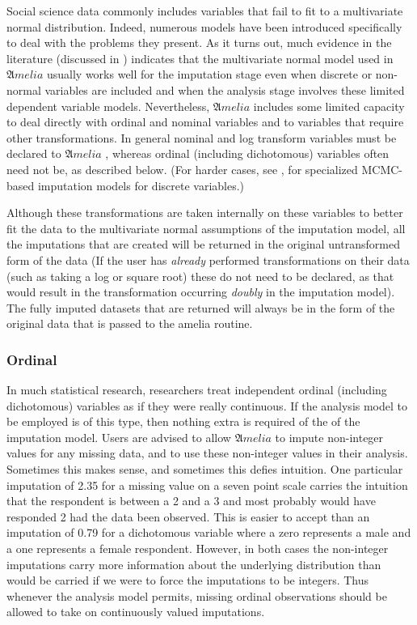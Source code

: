 \documentclass[12pt,titlepage]{article}
\newcommand{\Amelia}{\ensuremath{\mathfrak Amelia} }
\begin{document}
Social science data commonly includes variables that fail to fit to
a multivariate normal distribution. Indeed, numerous models have been
introduced specifically to deal with the problems they present.  As it
turns out, much evidence in the literature (discussed in
\citealt{KinHonJos01}) indicates that the multivariate normal model
used in ${\mathfrak Amelia}$ usually works well for the imputation
stage even when discrete or non-normal variables are included and when
the analysis stage involves these limited dependent variable models.
Nevertheless, ${\mathfrak Amelia}$ includes some limited capacity to
deal directly with ordinal and nominal variables and to variables that
require other transformations.  In general nominal and log transform
variables must be declared to \Amelia, whereas ordinal (including
dichotomous) variables often need not be, as described below.  (For
harder cases, see \citep{Schafer97}, for specialized MCMC-based imputation
models for discrete variables.)\nocite{KinHonJos01}

Although these transformations are taken internally on these variables
to better fit the data to the multivariate normal assumptions of the
imputation model, all the imputations that are created will be
returned in the original untransformed form of the data (If the user
has \emph{already} performed transformations on their data (such as
taking a log or square root) these do not need to be declared, as that
would result in the transformation occurring \emph{doubly} in the
imputation model).  The fully imputed datasets that are returned will
always be in the form of the original data that is passed to the
amelia routine.

\subsubsection{Ordinal}
\label{sec:ord}
In much statistical research, researchers treat independent ordinal
(including dichotomous) variables as if they were really continuous.
If the analysis model to be employed is of this type, then nothing
extra is required of the of the imputation model. Users are advised to
allow ${\mathfrak Amelia}$ to impute non-integer values for any
missing data, and to use these non-integer values in their analysis.
Sometimes this makes sense, and sometimes this defies intuition. One
particular imputation of 2.35 for a missing value on a seven point
scale carries the intuition that the respondent is between a 2 and a 3
and most probably would have responded 2 had the data been observed.
This is easier to accept than an imputation of 0.79 for a dichotomous
variable where a zero represents a male and a one represents a female
respondent. However, in both cases the non-integer imputations carry
more information about the underlying distribution than would be
carried if we were to force the imputations to be integers. Thus
whenever the analysis model permits, missing ordinal observations
should be allowed to take on continuously valued imputations.
\end{document}
